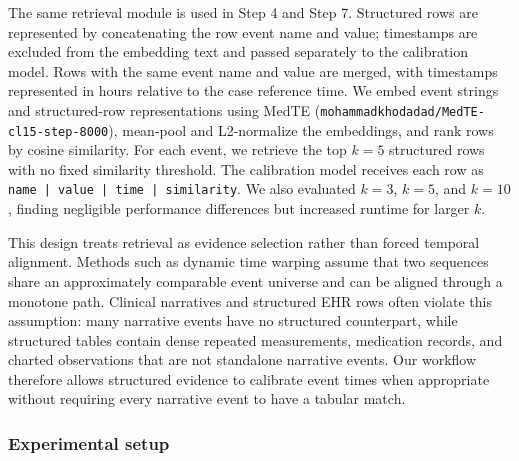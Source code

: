 The same retrieval module is used in Step 4 and Step 7. Structured rows are represented by concatenating the row event name and value; timestamps are excluded from the embedding text and passed separately to the calibration model.
Rows with the same event name and value are merged, with timestamps represented in hours relative to the case reference time.
We embed event strings and structured-row representations using MedTE (\texttt{mohammadkhodadad/MedTE-cl15-step-8000}), mean-pool and L2-normalize the embeddings, and rank rows by cosine similarity.
For each event, we retrieve the top $k=5$ structured rows with no fixed similarity threshold.
The calibration model receives each row as \texttt{name | value | time | similarity}. 
We also evaluated $k=3$, $k=5$, and $k=10$, finding negligible performance differences but increased runtime for larger $k$.

This design treats retrieval as evidence selection rather than forced temporal alignment.
Methods such as dynamic time warping assume that two sequences share an approximately comparable event universe and can be aligned through a monotone path.
Clinical narratives and structured EHR rows often violate this assumption: many narrative events have no structured counterpart, while structured tables contain dense repeated measurements, medication records, and charted observations that are not standalone narrative events.
Our workflow therefore allows structured evidence to calibrate event times when appropriate without requiring every narrative event to have a tabular match.


\subsubsection{Experimental setup}
\label{ch08:sec:experimental_setup}


